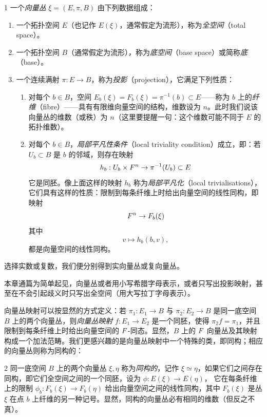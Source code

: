 \begin{defn}{1}
一个\emph{向量丛} $\xi=(E,\pi,B)$ 由下列数据组成：
\begin{enumerate}[label=\arabic*.]
\item 一个拓扑空间 $E$（也记作 $E(\xi)$，通常假定为流形），称为\emph{全空间}（total space）。
\item 一个拓扑空间 $B$（通常假定为流形），称为\emph{底空间}（base space）或简称\emph{底}（base）。
\item 一个连续满射 $\pi: E\to B$，称为\emph{投影}（projection），它满足下列性质：
\begin{enumerate}[label=\roman*.]
\item 对每个 $b\in B$，空间 $E_b(\xi)=F_b(\xi)=\pi^{-1}(b)\subset E$——称为 $b$ 上的\emph{纤维}（fibre）——具有有限维向量空间的结构，维数设为
$n$。此时我们说该向量丛的维数（或秩）为 $n$（这里要提醒一句：这个维数可能不同于 $E$ 的拓扑维数）。
\item 对每个 $b\in B$，\emph{局部平凡性条件}（local triviality condition）成立，即：若 $U_b\subset B$ 是 $b$ 的邻域，则存在映射
\[ h_b: U_b\times F^n\to\pi^{-1}(U_b)\subset E \]
它是同胚。像上面这样的映射 $h_b$ 称为\emph{局部平凡化}（local trivialisations），它们具有这样的性质：限制到每条纤维上时给出向量空间的线性同构，即映射
\[ F^n\to F_b(\xi) \]
其中
\[ v\mapsto h_b(b,v), \]
都是向量空间的线性同构。
\end{enumerate}
\end{enumerate}
\end{defn}


选择实数或复数，我们便分别得到实向量丛或复向量丛。

本章通篇为简单起见，向量丛或者用小写希腊字母表示，或者只写出投影映射，甚至在不会引起歧义时只写出全空间（用大写拉丁字母表示）。

向量丛映射可以按显然的方式定义：若 $\pi_1: E_1\to B$ 与 $\pi_2: E_2\to B$ 是同一底空间 $B$ 上的两个向量丛，则\emph{向量丛映射} $f: E_1\to E_2$ 是一个同胚，使得 $\pi_2 f=\pi_1$，并且限制到每条纤维上时给出向量空间的 $F$-同态。显然，$B$ 上的 $F$ 向量丛及其映射构成一个加法范畴。我们更感兴趣的是向量丛映射中一个特殊的类，即同构；相应的向量丛则称为同构的：

\begin{defn}{2}
同一底空间 $B$ 上的两个向量丛 $\xi,\eta$ 称为\emph{同构的}，记作 $\xi\simeq\eta$，如果它们之间存在同构，即它们全空间之间的一个同胚，设为 $\phi: E(\xi)\to E(\eta)$，
它在每条纤维上的限制 $\phi_b: F_b(\xi)\to F_b(\eta)$ 给出向量空间之间的线性同构，其中 $F_b(\xi)$ 是丛 $\xi$ 在点 $b$ 上纤维的另一种记号。显然，同构的向量丛必有相同的维数（但反之不真）。
\end{defn}

